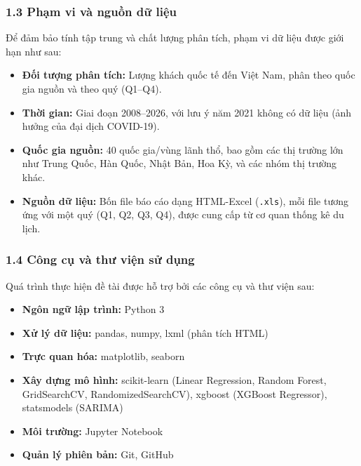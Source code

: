 \documentclass[11pt]{article}
\providecommand{\tightlist}{%
      \setlength{\itemsep}{0pt}\setlength{\parskip}{0pt}}
\begin{document}
\subsubsection{1.3 Phạm vi và nguồn dữ
liệu}\label{phux1ea1m-vi-vuxe0-nguux1ed3n-dux1eef-liux1ec7u}

Để đảm bảo tính tập trung và chất lượng phân tích, phạm vi dữ liệu được
giới hạn như sau:

\begin{itemize}
\tightlist
\item
  \textbf{Đối tượng phân tích:} Lượng khách quốc tế đến Việt Nam, phân
  theo quốc gia nguồn và theo quý (Q1--Q4).
\item
  \textbf{Thời gian:} Giai đoạn 2008--2026, với lưu ý năm 2021 không có
  dữ liệu (ảnh hưởng của đại dịch COVID-19).
\item
  \textbf{Quốc gia nguồn:} 40 quốc gia/vùng lãnh thổ, bao gồm các thị
  trường lớn như Trung Quốc, Hàn Quốc, Nhật Bản, Hoa Kỳ, và các nhóm thị
  trường khác.
\item
  \textbf{Nguồn dữ liệu:} Bốn file báo cáo dạng HTML-Excel
  (\texttt{.xls}), mỗi file tương ứng với một quý (Q1, Q2, Q3, Q4), được
  cung cấp từ cơ quan thống kê du lịch.
\end{itemize}

\subsubsection{1.4 Công cụ và thư viện sử
dụng}\label{cuxf4ng-cux1ee5-vuxe0-thux1b0-viux1ec7n-sux1eed-dux1ee5ng}

Quá trình thực hiện đề tài được hỗ trợ bởi các công cụ và thư viện sau:

\begin{itemize}
\tightlist
\item
  \textbf{Ngôn ngữ lập trình:} Python 3
\item
  \textbf{Xử lý dữ liệu:} pandas, numpy, lxml (phân tích HTML)
\item
  \textbf{Trực quan hóa:} matplotlib, seaborn
\item
  \textbf{Xây dựng mô hình:} scikit-learn (Linear Regression, Random
  Forest, GridSearchCV, RandomizedSearchCV), xgboost (XGBoost
  Regressor), statsmodels (SARIMA)
\item
  \textbf{Môi trường:} Jupyter Notebook
\item
  \textbf{Quản lý phiên bản:} Git, GitHub
\end{itemize}
\end{document}
